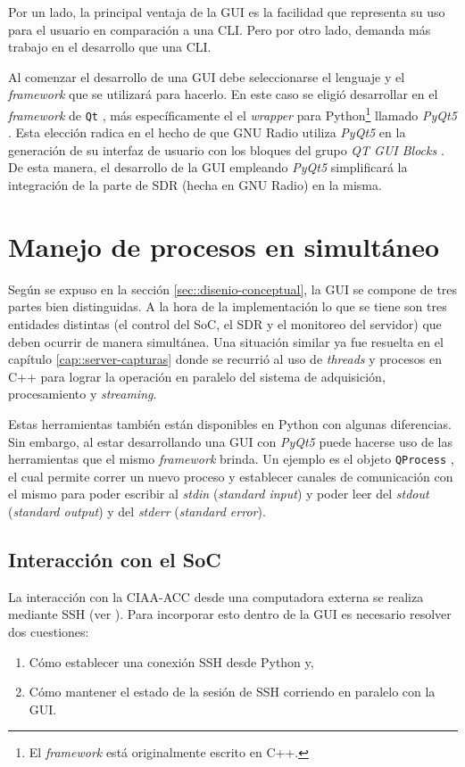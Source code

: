\documentclass[../../main.tex]{subfiles}
\begin{document}
Por un lado, la principal ventaja de la GUI es la facilidad que representa su uso para el usuario en comparación a una CLI. Pero por otro lado, demanda más trabajo en el desarrollo que una CLI.

Al comenzar el desarrollo de una GUI debe seleccionarse el lenguaje y el \textit{framework} que se utilizará para hacerlo. En este caso se eligió desarrollar en el \textit{framework} de \texttt{Qt} \cite{Qt-framework}, más específicamente el el \textit{wrapper} para Python\footnote{El \textit{framework} está originalmente escrito en C++.} llamado \textit{PyQt5} \cite{pyqt5}. Esta elección radica en el hecho de que GNU Radio utiliza \textit{PyQt5} en la generación de su interfaz de usuario con los bloques del grupo \textit{QT GUI Blocks} \cite{gnuradio-qt}. De esta manera, el desarrollo de la GUI empleando \textit{PyQt5} simplificará la integración de la parte de SDR (hecha en GNU Radio) en la misma.

\section{Manejo de procesos en simultáneo}
Según se expuso en la sección \ref{sec::disenio-conceptual}, la GUI se compone de tres partes bien distinguidas. A la hora de la implementación lo que se tiene son tres entidades distintas (el control del SoC, el SDR y el monitoreo del servidor) que deben ocurrir de manera simultánea. Una situación similar ya fue resuelta en el capítulo \ref{cap::server-capturas} donde se recurrió al uso de \textit{threads} y procesos en C++ para lograr la operación en paralelo del sistema de adquisición, procesamiento y \textit{streaming}. 

Estas herramientas también están disponibles en Python con algunas diferencias. Sin embargo, al estar desarrollando una GUI con \textit{PyQt5} puede hacerse uso de las herramientas que el mismo \textit{framework} brinda. Un ejemplo es el objeto \texttt{QProcess} \cite{qprocess}, el cual permite correr un nuevo proceso y establecer canales de comunicación con el mismo para poder escribir al \textit{stdin} (\textit{standard input}) y poder leer del \textit{stdout} (\textit{standard output}) y del \textit{stderr} (\textit{standard error}).

\subsection{Interacción con el SoC}
La interacción con la CIAA-ACC desde una computadora externa se realiza mediante SSH (ver \cite{proyecto-jose}). Para incorporar esto dentro de la GUI es necesario resolver dos cuestiones:
\begin{enumerate}
    \item Cómo establecer una conexión SSH desde Python y,
    \item Cómo mantener el estado de la sesión de SSH corriendo en paralelo con la GUI.
\end{enumerate}
\end{document}
